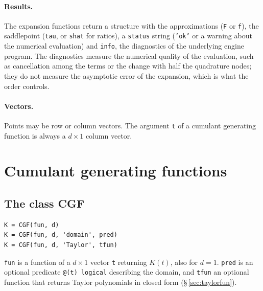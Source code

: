 \documentclass[11pt]{article}
\newcommand{\prog}[1]{\texttt{#1}}
\begin{document}
\paragraph{Results.} The expansion functions return a structure with the approximations (\prog{F}
or \prog{f}), the saddlepoint (\prog{tau}, or \prog{shat} for ratios), a \prog{status} string
(\prog{'ok'} or a warning about the numerical evaluation) and \prog{info}, the diagnostics of the
underlying engine program. The diagnostics measure the numerical quality of the evaluation, such
as cancellation among the terms or the change with half the quadrature nodes; they do not measure
the asymptotic error of the expansion, which is what the order controls.

\paragraph{Vectors.} Points may be row or column vectors. The argument \prog{t} of a cumulant
generating function is always a $d\times1$ column vector.

\section{Cumulant generating functions}\label{sec:cgf}

\subsection{The class CGF}

\begin{lstlisting}
K = CGF(fun, d)
K = CGF(fun, d, 'domain', pred)
K = CGF(fun, d, 'Taylor', tfun)
\end{lstlisting}
\prog{fun} is a function of a $d\times1$ vector \prog{t} returning $K(t)$, also for $d=1$.
\prog{pred} is an optional predicate \prog{@(t) logical} describing the domain, and \prog{tfun} an
optional function that returns Taylor polynomials in closed form (\S\,\ref{sec:taylorfun}).
\end{document}
